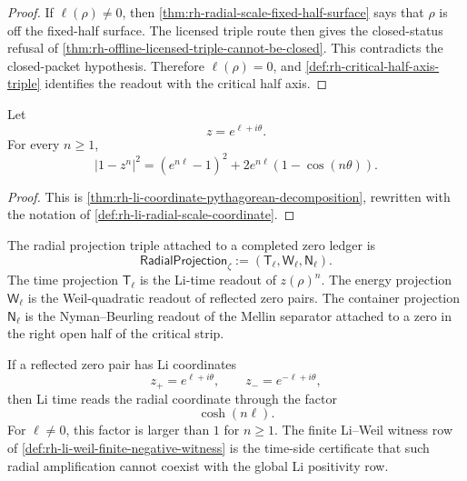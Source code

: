 \begin{proof}
If $\ell(\rho)\ne0$, then
\autoref{thm:rh-radial-scale-fixed-half-surface} says that $\rho$ is
off the fixed-half surface.  The licensed triple route then gives the
closed-status refusal of
\autoref{thm:rh-offline-licensed-triple-cannot-be-closed}.  This
contradicts the closed-packet hypothesis.  Therefore $\ell(\rho)=0$,
and \autoref{def:rh-critical-half-axis-triple} identifies the readout
with the critical half axis.
\end{proof}

\begin{theorem}
\label{thm:rh-li-radial-pythagorean-identity}
Let
$$
z=e^{\ell+i\theta}.
$$
For every $n\ge1$,
$$
|1-z^n|^2
=
(e^{n\ell}-1)^2
+
2e^{n\ell}(1-\cos(n\theta)).
$$
\end{theorem}

\begin{proof}
This is \autoref{thm:rh-li-coordinate-pythagorean-decomposition},
rewritten with the notation of
\autoref{def:rh-li-radial-scale-coordinate}.
\end{proof}

\begin{definition}
\label{def:rh-radial-projection-triple}
The radial projection triple attached to a completed zero ledger is
$$
\mathsf{RadialProjection}_{\zeta}
:=
(\mathsf T_{\ell},\mathsf W_{\ell},\mathsf N_{\ell}).
$$
The time projection $\mathsf T_{\ell}$ is the Li-time readout of
$z(\rho)^n$.  The energy projection $\mathsf W_{\ell}$ is the
Weil-quadratic readout of reflected zero pairs.  The container
projection $\mathsf N_{\ell}$ is the Nyman--Beurling readout of the
Mellin separator attached to a zero in the right open half of the
critical strip.
\end{definition}

\begin{principle}
\label{prin:rh-time-projection-nonzero-radial-scale}
If a reflected zero pair has Li coordinates
$$
z_+=e^{\ell+i\theta},
\qquad
z_-=e^{-\ell+i\theta},
$$
then Li time reads the radial coordinate through the factor
$$
\cosh(n\ell).
$$
For $\ell\ne0$, this factor is larger than $1$ for $n\ge1$.  The
finite Li--Weil witness row of
\autoref{def:rh-li-weil-finite-negative-witness} is the time-side
certificate that such radial amplification cannot coexist with the
global Li positivity row.
\end{principle}

